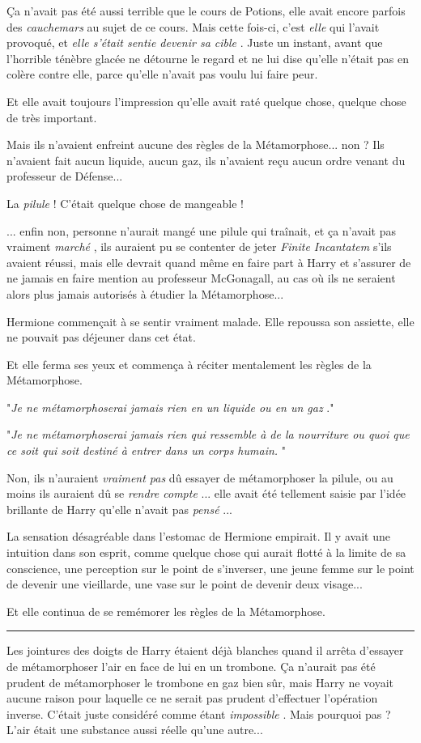 Ça n'avait pas été aussi terrible que le cours de Potions, elle avait encore parfois des \emph{cauchemars}  au sujet de ce cours. Mais cette fois-ci, c'est \emph{elle}  qui l'avait provoqué, et \emph{elle s'était sentie devenir sa cible} . Juste un instant, avant que l'horrible ténèbre glacée ne détourne le regard et ne lui dise qu'elle n'était pas en colère contre elle, parce qu'elle n'avait pas voulu lui faire peur.

Et elle avait toujours l'impression qu'elle avait raté quelque chose, quelque chose de très important.

Mais ils n'avaient enfreint aucune des règles de la Métamorphose... non ? Ils n'avaient fait aucun liquide, aucun gaz, ils n'avaient reçu aucun ordre venant du professeur de Défense...

La \emph{pilule}  ! C'était quelque chose de mangeable !

... enfin non, personne n'aurait mangé une pilule qui traînait, et ça n'avait pas vraiment \emph{marché} , ils auraient pu se contenter de jeter \emph{Finite Incantatem}  s'ils avaient réussi, mais elle devrait quand même en faire part à Harry et s'assurer de ne jamais en faire mention au professeur McGonagall, au cas où ils ne seraient alors plus jamais autorisés à étudier la Métamorphose...

Hermione commençait à se sentir vraiment malade. Elle repoussa son assiette, elle ne pouvait pas déjeuner dans cet état.

Et elle ferma ses yeux et commença à réciter mentalement les règles de la Métamorphose.

"\emph{Je ne métamorphoserai jamais rien en un liquide ou en un gaz} ."

"\emph{Je ne métamorphoserai jamais rien qui ressemble à de la nourriture ou quoi que ce soit qui soit destiné à entrer dans un corps humain.} "

Non, ils n'auraient \emph{vraiment pas}  dû essayer de métamorphoser la pilule, ou au moins ils auraient dû se \emph{rendre compte} ... elle avait été tellement saisie par l'idée brillante de Harry qu'elle n'avait pas \emph{pensé} ...

La sensation désagréable dans l'estomac de Hermione empirait. Il y avait une intuition dans son esprit, comme quelque chose qui aurait flotté à la limite de sa conscience, une perception sur le point de s'inverser, une jeune femme sur le point de devenir une vieillarde, une vase sur le point de devenir deux visage...

Et elle continua de se remémorer les règles de la Métamorphose.
\par\noindent\rule{\textwidth}{0.4pt}
Les jointures des doigts de Harry étaient déjà blanches quand il arrêta d'essayer de métamorphoser l'air en face de lui en un trombone. Ça n'aurait pas été prudent de métamorphoser le trombone en gaz bien sûr, mais Harry ne voyait aucune raison pour laquelle ce ne serait pas prudent d'effectuer l'opération inverse. C'était juste considéré comme étant \emph{impossible} . Mais pourquoi pas ? L'air était une substance aussi réelle qu'une autre...

